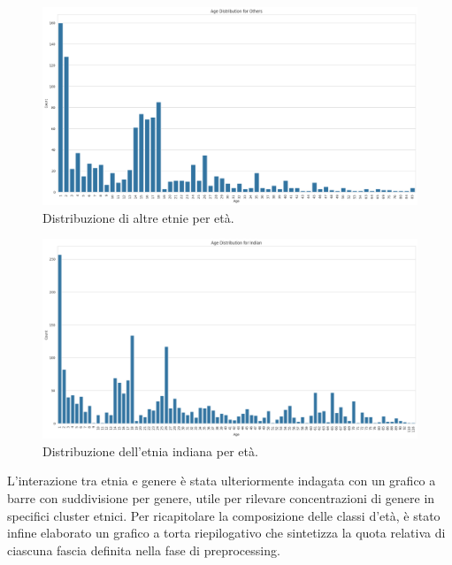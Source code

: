 \documentclass[a4paper,12pt]{report}
\begin{document}
	\begin{figure}[H]
		\centering
		\includegraphics[width=1.0\textwidth]{img/pie_ethnic_others_image.png}
		\caption{Distribuzione di altre etnie per età.}
	\end{figure}
	\begin{figure}[H]
		\centering
		\includegraphics[width=1.0\textwidth]{img/pie_ethnic_indian_image.png}
		\caption{Distribuzione dell'etnia indiana per età.}
	\end{figure}
	
	L'interazione tra etnia e genere è stata ulteriormente indagata con un grafico a barre con suddivisione per genere, utile per rilevare concentrazioni di genere in specifici cluster etnici. Per ricapitolare la composizione delle classi d'età, è stato infine elaborato un grafico a torta riepilogativo che sintetizza la quota relativa di ciascuna fascia definita nella fase di preprocessing. \\
	
\end{document}
